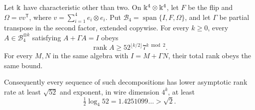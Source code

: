 \begin{theorem}
\label{prop:full-flip-cup-four}
Let $\Bbbk$ have characteristic other than two. On
$\Bbbk^4\otimes\Bbbk^4$, let $F$ be the flip and
$\Omega=vv^{\mathsf T}$, where $v=\sum_{i=1}^4e_i\otimes e_i$.
Put $\mathcal B_4=\operatorname{span}\{I,F,\Omega\}$, and let
$\Gamma$ be partial transpose in the second factor, extended
copywise. For every $k\geq0$, every
$A\in\mathcal B_4^{\otimes k}$ satisfying $A+\Gamma A=I$ obeys
\begin{equation}\label{eq:full-flip-cup-four-bound}
 \operatorname{rank}A\geq
 52^{\lfloor k/2\rfloor}7^{k\bmod2}.
\end{equation}
For every $M,N$ in the same algebra with $I=M+\Gamma N$,
their total rank obeys the same bound.

Consequently every sequence of such decompositions has lower
asymptotic rank rate at least $\sqrt{52}$ and exponent, in wire
dimension $4^k$, at least
\[
 \tfrac12\log_4 52=1.4251099\ldots>\sqrt2.
\]
\end{theorem}
